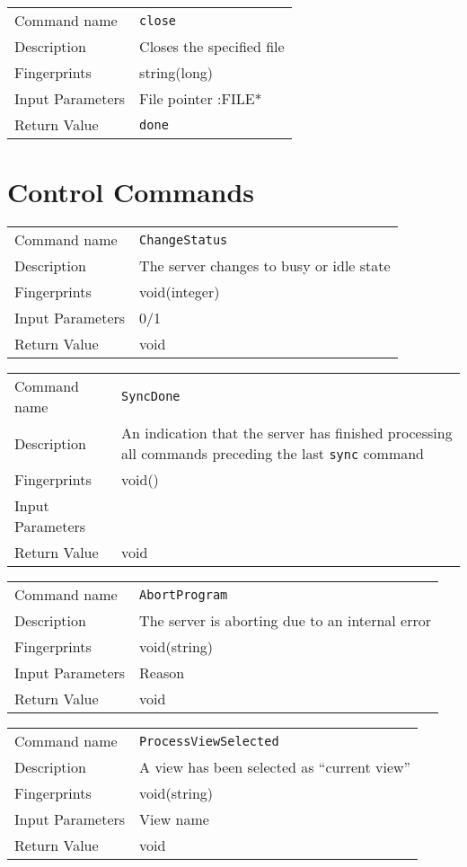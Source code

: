 \noindent
\begin{tabular}{l|p{5in}}
\hline
Command name &{\tt close }\\ 
Description &
 Closes the specified file 
 	\\
Fingerprints & string(long)\\
Input Parameters& File pointer :FILE*\\
Return Value&{\tt done}\\
\hline
\end{tabular}
\bigskip


\section{Control Commands}
\noindent
\begin{tabular}{l|p{5in}}
\hline
Command name &{\tt ChangeStatus }\\ 
Description &
 The server changes to busy or idle state 
 	\\
Fingerprints & void(integer)\\
Input Parameters& 0/1 \\
Return Value&void\\
\hline
\end{tabular}
\bigskip

\noindent
\begin{tabular}{l|p{5in}}
\hline
Command name &{\tt SyncDone }\\ 
Description &
 An indication that the server has finished processing all commands preceding the last {\tt sync} command 
 	\\
Fingerprints & void()\\
Input Parameters&\\
Return Value&void\\
\hline
\end{tabular}
\bigskip

\noindent
\begin{tabular}{l|p{5in}}
\hline
Command name &{\tt AbortProgram }\\ 
Description &
 The server is aborting due to an internal error 
 	\\
Fingerprints & void(string)\\
Input Parameters& Reason \\
Return Value&void\\
\hline
\end{tabular}
\bigskip

\noindent
\begin{tabular}{l|p{5in}}
\hline
Command name &{\tt ProcessViewSelected }\\ 
Description &
 A view has been selected as ``current view'' 
 	\\
Fingerprints & void(string)\\
Input Parameters& View name \\
Return Value&void\\
\hline
\end{tabular}
\bigskip

